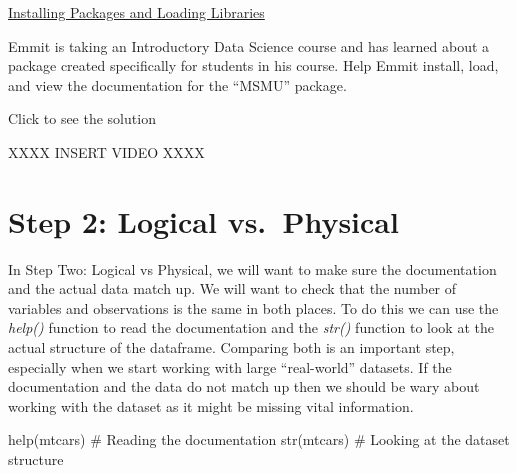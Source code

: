 \documentclass[
  letterpaper,
  DIV=11,
  numbers=noendperiod]{scrreprt}
\newenvironment{Shaded}{\begin{snugshade}}{\end{snugshade}}
\newcommand{\CommentTok}[1]{\textcolor[rgb]{0.37,0.37,0.37}{#1}}
\newcommand{\FunctionTok}[1]{\textcolor[rgb]{0.28,0.35,0.67}{#1}}
\newcommand{\NormalTok}[1]{\textcolor[rgb]{0.00,0.23,0.31}{#1}}
\begin{document}
\begin{watch}{}{}
    \href{https://youtu.be/6UPqEI9-uFE}{Installing Packages and Loading Libraries}
\end{watch}

\begin{tcolorbox}[enhanced jigsaw, colframe=quarto-callout-tip-color-frame, colback=white, breakable, rightrule=.15mm, title=\textcolor{quarto-callout-tip-color}{\faLightbulb}\hspace{0.5em}{Try it Out}, bottomtitle=1mm, toptitle=1mm, titlerule=0mm, left=2mm, coltitle=black, colbacktitle=quarto-callout-tip-color!10!white, leftrule=.75mm, opacitybacktitle=0.6, bottomrule=.15mm, opacityback=0, arc=.35mm, toprule=.15mm]

Emmit is taking an Introductory Data Science course and has learned
about a package created specifically for students in his course. Help
Emmit install, load, and view the documentation for the ``MSMU''
package.

Click to see the solution

XXXX INSERT VIDEO XXXX

\end{tcolorbox}

\section{Step 2: Logical
vs.~Physical}\label{step-2-logical-vs.-physical}

In Step Two: Logical vs Physical, we will want to make sure the
documentation and the actual data match up. We will want to check that
the number of variables and observations is the same in both places. To
do this we can use the \emph{help()} function to read the documentation
and the \emph{str()} function to look at the actual structure of the
dataframe. Comparing both is an important step, especially when we start
working with large ``real-world'' datasets. If the documentation and the
data do not match up then we should be wary about working with the
dataset as it might be missing vital information.

\begin{Shaded}
\begin{Highlighting}[]
\FunctionTok{help}\NormalTok{(mtcars) }\CommentTok{\# Reading the documentation}
\FunctionTok{str}\NormalTok{(mtcars) }\CommentTok{\# Looking at the dataset structure}
\end{Highlighting}
\end{Shaded}
\end{document}
